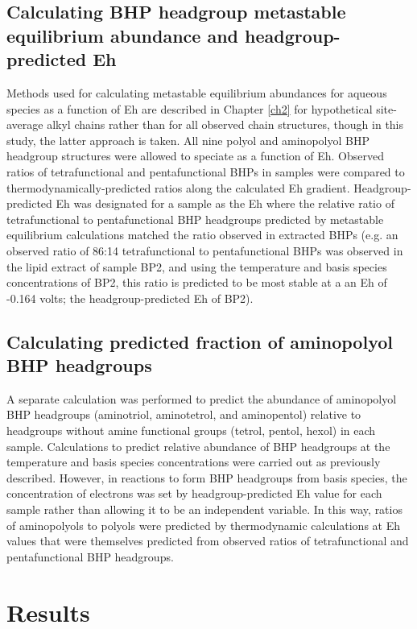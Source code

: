 \subsection{Calculating BHP headgroup metastable equilibrium abundance and headgroup-predicted Eh}

Methods used for calculating metastable equilibrium abundances for aqueous species as a function of Eh are described in Chapter \ref{ch2} for hypothetical site-average alkyl chains rather than for all observed chain structures, though in this study, the latter approach is taken. All nine polyol and aminopolyol BHP headgroup structures were allowed to speciate as a function of Eh. Observed ratios of tetrafunctional and pentafunctional BHPs in samples were compared to thermodynamically-predicted ratios along the calculated Eh gradient. Headgroup-predicted Eh was designated for a sample as the Eh where the relative ratio of tetrafunctional to pentafunctional BHP headgroups predicted by metastable equilibrium calculations matched the ratio observed in extracted BHPs (e.g. an observed ratio of 86:14 tetrafunctional to pentafunctional BHPs was observed in the lipid extract of sample BP2, and using the temperature and basis species concentrations of BP2, this ratio is predicted to be most stable at a an Eh of -0.164 volts; the headgroup-predicted Eh of BP2).

\subsection{Calculating predicted fraction of aminopolyol BHP headgroups}

A separate calculation was performed to predict the abundance of aminopolyol BHP headgroups (aminotriol, aminotetrol, and aminopentol) relative to headgroups without amine functional groups (tetrol, pentol, hexol) in each sample. Calculations to predict relative abundance of BHP headgroups at the temperature and basis species concentrations were carried out as previously described. However, in reactions to form BHP headgroups from basis species, the concentration of electrons was set by headgroup-predicted Eh value for each sample rather than allowing it to be an independent variable. In this way, ratios of aminopolyols to polyols were predicted by thermodynamic calculations at Eh values that were themselves predicted from observed ratios of tetrafunctional and pentafunctional BHP headgroups.


\section{Results}

